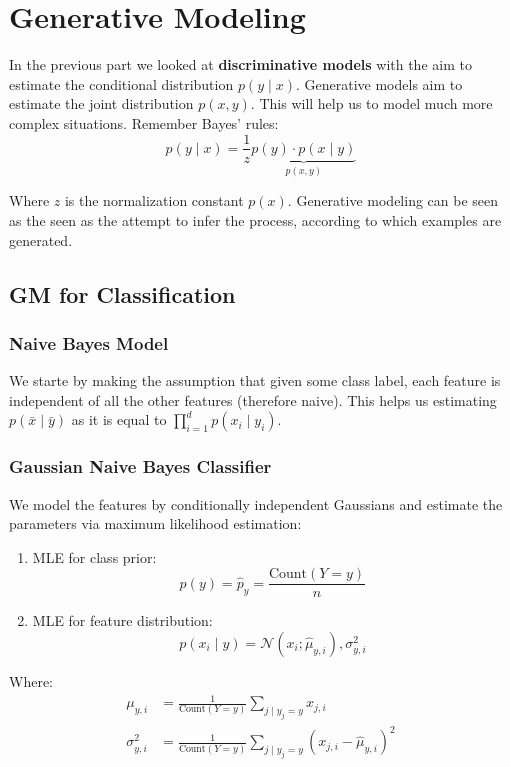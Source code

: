\section{Generative Modeling}

In the previous part we looked at \textbf{discriminative models} with the aim to estimate the conditional distribution $p(y \; | \; x)$. Generative models aim to estimate the joint distribution $p(x, y)$. This will help us to model much more complex situations. Remember Bayes' rules:
$$p(y \; | \; x) = \frac{1}{z} \underbrace{p(y) \cdot p(x \; | \; y)}_{p(x,y)}$$

Where $z$ is the normalization constant $p(x)$. Generative modeling can be seen as the seen as the attempt to infer the process, according to which examples are generated.

\subsection{GM for Classification}

\subsubsection{Naive Bayes Model}

We starte by making the assumption that given some class label, each feature is independent of all the other features (therefore naive). This helps us estimating $p(\bar x \; | \; \bar y)$ as it is equal to $\prod_{i=1}^d p(x_i \; | \; y_i)$. \medskip

\subsubsection{Gaussian Naive Bayes Classifier}

We model the features by conditionally independent Gaussians and estimate the parameters via maximum likelihood estimation:
\begin{enumerate}
	\item MLE for class prior:
		$$p(y) = \hat p_y = \frac{\text{Count}(Y = y)}{n}$$
	\item MLE for feature distribution:
		$$p(x_i \; | \; y) = \mathcal{N}(x_i; \hat \mu_{y,i}), \sigma^2_{y,i}$$
\end{enumerate}

Where:
\begin{align*}
	\mu_{y,i} &= \frac{1}{\text{Count}(Y = y)} \sum_{j \; | \; y_j = y} x_{j,i}\\
	\sigma^2_{y,i} &= \frac{1}{\text{Count}(Y = y)} \sum_{j \; | \; y_j = y} (x_{j,i} - \hat \mu_{y, i})^2
\end{align*}

